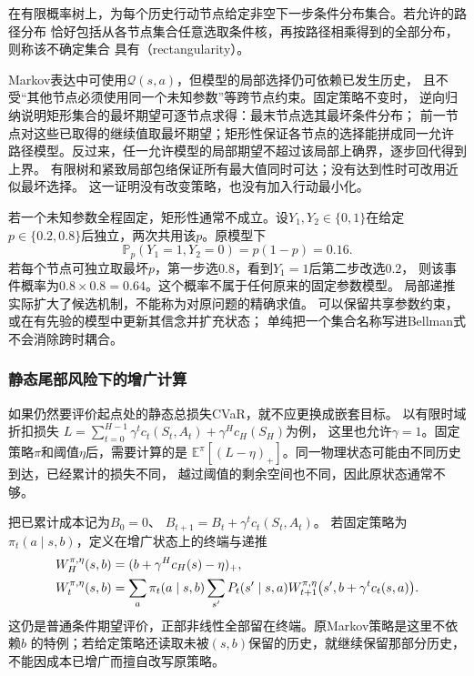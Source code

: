 \begin{definition}[条件分布集合的矩形性]
\label{def:decision-rectangular-uncertainty}
在有限概率树上，为每个历史行动节点给定非空下一步条件分布集合。若允许的路径分布
恰好包括从各节点集合任意选取条件核，再按路径相乘得到的全部分布，则称该不确定集合
具有（rectangularity）。
\end{definition}
Markov表达中可使用$\mathcal Q(s,a)$，但模型的局部选择仍可依赖已发生历史，
且不受“其他节点必须使用同一个未知参数”等跨节点约束。固定策略不变时，
逆向归纳说明矩形集合的最坏期望可逐节点求得：最末节点选其最坏条件分布；
前一节点对这些已取得的继续值取最坏期望；矩形性保证各节点的选择能拼成同一允许
路径模型。反过来，任一允许模型的局部期望不超过该局部上确界，逐步回代得到上界。
有限树和紧致局部包络保证所有最大值同时可达；没有达到性时可改用近似最坏选择。
这一证明没有改变策略，也没有加入行动最小化。

若一个未知参数全程固定，矩形性通常不成立。设$Y_1,Y_2\in\{0,1\}$在给定
$p\in\{0.2,0.8\}$后独立，两次共用该$p$。原模型下
\[
  \mathbb P_p(Y_1=1,Y_2=0)=p(1-p)=0.16.
\]
若每个节点可独立取最坏$p$，第一步选$0.8$，看到$Y_1=1$后第二步改选$0.2$，
则该事件概率为$0.8\times0.8=0.64$。这个概率不属于任何原来的固定参数模型。
局部递推实际扩大了候选机制，不能称为对原问题的精确求值。
可以保留共享参数约束，或在有先验的模型中更新其信念并扩充状态；
单纯把一个集合名称写进Bellman式不会消除跨时耦合。

\subsubsection{静态尾部风险下的增广计算}
\label{sec:policy-static-cvar-evaluation}

如果仍然要评价起点处的静态总损失CVaR，就不应更换成嵌套目标。
以有限时域折扣损失
$L=\sum_{t=0}^{H-1}\gamma^tc_t(S_t,A_t)+\gamma^Hc_H(S_H)$为例，
这里也允许$\gamma=1$。固定策略$\pi$和阈值$\eta$后，需要计算的是
$\mathbb E^\pi[(L-\eta)_+]$。同一物理状态可能由不同历史到达，已经累计的损失不同，
越过阈值的剩余空间也不同，因此原状态通常不够。

把已累计成本记为$B_0=0$、
$B_{t+1}=B_t+\gamma^tc_t(S_t,A_t)$。
若固定策略为$\pi_t(a\mid s,b)$，定义在增广状态上的终端与递推
\begin{align}
  W_H^{\pi,\eta}(s,b)&=(b+\gamma^Hc_H(s)-\eta)_+,\notag\\
  W_t^{\pi,\eta}(s,b)
  &=\sum_a\pi_t(a\mid s,b)\sum_{s'}P_t(s'\mid s,a)
    W_{t+1}^{\pi,\eta}\bigl(s',b+\gamma^tc_t(s,a)\bigr).
  \label{eq:policy-static-cvar-augmented-evaluation}
\end{align}
这仍是普通条件期望评价，正部非线性全部留在终端。原Markov策略是这里不依赖$b$
的特例；若给定策略还读取未被$(s,b)$保留的历史，就继续保留那部分历史，
不能因成本已增广而擅自改写原策略。

